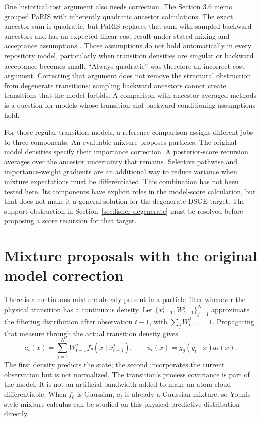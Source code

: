 \documentclass[11pt]{article}
\begin{document}
One historical cost argument also needs correction. The Section 3.6 memo
grouped PaRIS with inherently quadratic ancestor calculations. The exact
ancestor sum is quadratic, but PaRIS replaces that sum with sampled backward
ancestors and has an expected linear-cost result under stated mixing and
acceptance assumptions \citep[Section 3.1, Algorithm 2; Section 3.2.4,
Theorem 10]{olsson2014paris}. Those assumptions do not hold automatically in
every repository model, particularly when transition densities are singular
or backward acceptance becomes small. ``Always quadratic'' was therefore an
incorrect cost argument. Correcting that argument does not remove the
structural obstruction from degenerate transitions: sampling backward
ancestors cannot create transitions that the model forbids. A comparison
with ancestor-averaged methods is a question for models whose transition and
backward-conditioning assumptions hold.

For those regular-transition models, a reference comparison assigns different
jobs to three components.
An evaluable mixture proposes particles. The original model densities specify
their importance correction. A posterior-score recursion averages over the
ancestor uncertainty that remains. Selective pathwise and importance-weight
gradients are an additional way to reduce variance when mixture expectations
must be differentiated. This combination has not been tested here. Its
components have explicit roles in the model-score calculation, but that
does not make it a general solution for the degenerate DSGE target. The
support obstruction in Section~\ref{sec:fisher-degenerate} must be resolved
before proposing a score recursion for that target.


\section{Mixture proposals with the original model correction}
\label{sec:model-mixtures}

There is a continuous mixture already present in a particle filter whenever
the physical transition has a continuous density. Let
$\{x_{t-1}^j,W_{t-1}^j\}_{j=1}^N$ approximate the filtering distribution
after observation $t-1$, with $\sum_jW_{t-1}^j=1$. Propagating that measure
through the actual transition density gives
\begin{equation}
 a_t(x)=\sum_{j=1}^N W_{t-1}^j f_\theta(x\mid x_{t-1}^j),\qquad
 u_t(x)=g_\theta(y_t\mid x)a_t(x).
 \label{eq:physical-predictive-mixture}
\end{equation}
The first density predicts the state; the second incorporates the current
observation but is not normalized. The transition's process covariance is
part of the model. It is not an artificial bandwidth added to make an atom
cloud differentiable. When $f_\theta$ is Gaussian, $a_t$ is already a Gaussian
mixture, so Younis-style mixture calculus can be studied on this physical
predictive distribution directly.
\end{document}
